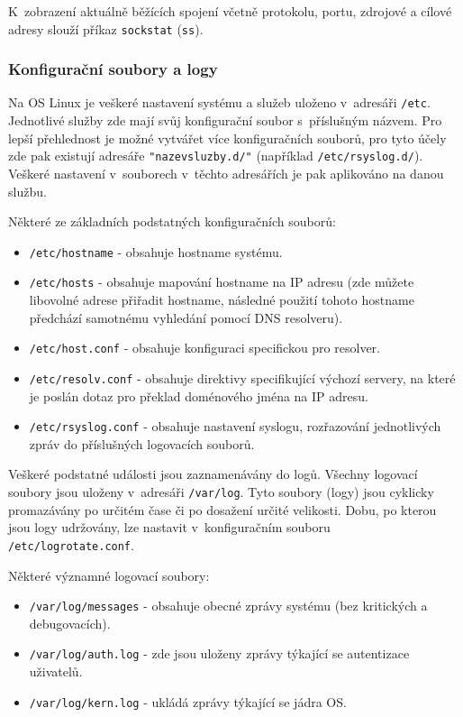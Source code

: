 K~zobrazení aktuálně běžících spojení včetně protokolu, portu, zdrojové a cílové adresy slouží příkaz \texttt{sockstat} (\texttt{ss}).

\subsubsection{Konfigurační soubory a logy}
Na OS Linux je veškeré nastavení systému a služeb uloženo v~adresáři \texttt{/etc}. Jednotlivé služby zde mají svůj konfigurační soubor s~příslušným názvem. Pro lepší přehlednost je možné vytvářet více konfiguračních souborů, pro tyto účely zde pak existují adresáře \texttt{"nazevsluzby.d/"} (například \texttt{/etc/rsyslog.d/}). Veškeré nastavení v~souborech v~těchto adresářích je pak aplikováno na danou službu.

Některé ze základních podstatných konfiguračních souborů:
\begin{itemize}
				\item \texttt{/etc/hostname} - obsahuje hostname systému.
				\item \texttt{/etc/hosts} - obsahuje mapování hostname na IP adresu (zde můžete libovolné adrese přiřadit hostname, následné použití tohoto hostname předchází samotnému vyhledání pomocí DNS resolveru).
				\item \texttt{/etc/host.conf} - obsahuje konfiguraci specifickou pro resolver.
				\item \texttt{/etc/resolv.conf} - obsahuje direktivy specifikující výchozí servery, na které je poslán dotaz pro překlad doménového jména na IP adresu.
				\item \texttt{/etc/rsyslog.conf} - obsahuje nastavení syslogu, rozřazování jednotlivých zpráv do příslušných logovacích souborů.
\end{itemize}


Veškeré podstatné události jsou zaznamenávány do logů. Všechny logovací soubory jsou uloženy v~adresáři \texttt{/var/log}. Tyto soubory (logy) jsou cyklicky promazávány po určitém čase či po dosažení určité velikosti. Dobu, po kterou jsou logy udržovány, lze nastavit v~konfiguračním souboru\\\texttt{/etc/logrotate.conf}.

Některé významné logovací soubory:
\begin{itemize}
				\item \texttt{/var/log/messages} - obsahuje obecné zprávy systému (bez kritických a debugovacích).
				\item \texttt{/var/log/auth.log} - zde jsou uloženy zprávy týkající se autentizace uživatelů.
				\item \texttt{/var/log/kern.log} - ukládá zprávy týkající se jádra OS.
\end{itemize}

